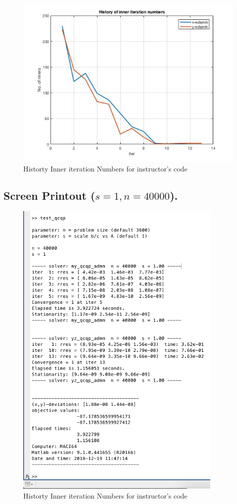 \begin{figure}[H]
\centering
\includegraphics[width=12cm]{F_7/F_1_4.jpg}
\caption{Historty Inner iteration Numbers for instructor's code}
\end{figure}
\subsection{Screen Printout ($s=1,n=40000$).}
\begin{figure}[H]
\centering
\includegraphics[width=10cm]{F_7/F_1_1.png}
\caption{Historty Inner iteration Numbers for instructor's code}
\end{figure}




